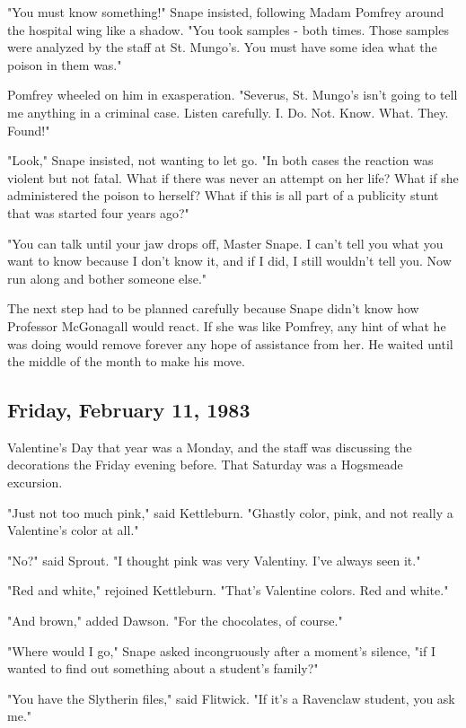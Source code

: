 "You must know something!" Snape insisted, following Madam Pomfrey around the hospital wing like a shadow. "You took samples - both times. Those samples were analyzed by the staff at St. Mungo's. You must have some idea what the poison in them was."

Pomfrey wheeled on him in exasperation. "Severus, St. Mungo's isn't going to tell me anything in a criminal case. Listen carefully. I. Do. Not. Know. What. They. Found!"

"Look," Snape insisted, not wanting to let go. "In both cases the reaction was violent but not fatal. What if there was never an attempt on her life? What if she administered the poison to herself? What if this is all part of a publicity stunt that was started four years ago?"

"You can talk until your jaw drops off, Master Snape. I can't tell you what you want to know because I don't know it, and if I did, I still wouldn't tell you. Now run along and bother someone else."

The next step had to be planned carefully because Snape didn't know how Professor McGonagall would react. If she was like Pomfrey, any hint of what he was doing would remove forever any hope of assistance from her. He waited until the middle of the month to make his move.

\subsection{Friday, February 11, 1983}

Valentine's Day that year was a Monday, and the staff was discussing the decorations the Friday evening before. That Saturday was a Hogsmeade excursion.

"Just not too much pink," said Kettleburn. "Ghastly color, pink, and not really a Valentine's color at all."

"No?" said Sprout. "I thought pink was very Valentiny. I've always seen it."

"Red and white," rejoined Kettleburn. "That's Valentine colors. Red and white."

"And brown," added Dawson. "For the chocolates, of course."

"Where would I go," Snape asked incongruously after a moment's silence, "if I wanted to find out something about a student's family?"

"You have the Slytherin files," said Flitwick. "If it's a Ravenclaw student, you ask me."

